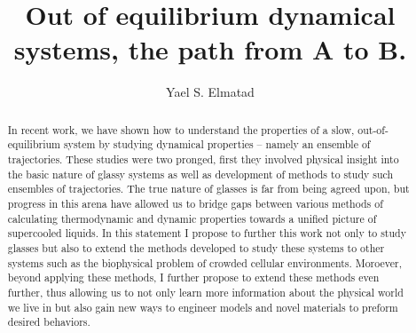 \documentclass[11pt]{article}
\title{{Out of equilibrium dynamical systems, the path from A to B.}}
\author{Yael S. Elmatad}
\date{}                                           %
\begin{document}
\maketitle
%
\begin{abstract}
In recent work, we have shown how to understand the properties of a slow, out-of-equilibrium system by studying dynamical properties -- namely an ensemble of trajectories.  These studies were two pronged, first they involved physical insight into the basic nature of glassy systems as well as development of methods to study such ensembles of trajectories.  The true nature of glasses is far from being agreed upon, but progress in this arena have allowed us to bridge gaps between various methods of calculating thermodynamic and dynamic properties towards a unified picture of supercooled liquids.  In this statement I propose to further this work not only to study glasses but also to extend the methods developed to study these systems to other systems such as the biophysical problem of crowded cellular environments.  Moroever, beyond applying these methods, I further propose to extend these methods even further, thus allowing us to not only learn more information about the physical world we live in but also gain new ways to engineer models and novel materials to preform desired behaviors.


\end{abstract}
\end{document}
